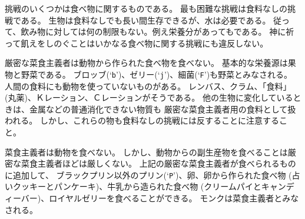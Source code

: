 挑戦のいくつかは食べ物に関するものである。
最も困難な挑戦は食料なしの挑戦である。
生物は食料なしでも長い間生存できるが、水は必要である。
従って、飲み物に対しては何の制限もない。例え栄養分があってもである。
神に祈って飢えをしのぐことはいかなる食べ物に関する挑戦にも違反しない。

厳密な菜食主義者は動物から作られた食べ物を食べない。
基本的な栄養源は果物と野菜である。
ブロッブ(`{\tt b}')、ゼリー(`{\tt j}')、細菌(`{\tt F}')も野菜とみなされる。
人間の食料にも動物を使っていないものがある。
レンバス、クラム、「食料」(丸薬)、Ｋレーション、Ｃレーションがそうである。
他の生物に変化しているときは、金属などの普通消化できない物質も
厳密な菜食主義者用の食料として扱われる。
しかし、これらの物も食料なしの挑戦には反することに注意すること。

菜食主義者は動物を食べない。
しかし、動物からの副生産物を食べることは厳密な菜食主義者ほどは厳しくない。
上記の厳密な菜食主義者が食べられるものに追加して、
ブラックプリン以外のプリン(`{\tt P}')、卵、卵から作られた食べ物
(占いクッキーとパンケーキ)、牛乳から造られた食べ物
(クリームパイとキャンディーバー)、ロイヤルゼリーを食べることができる。
モンクは菜食主義者とみなされる。

